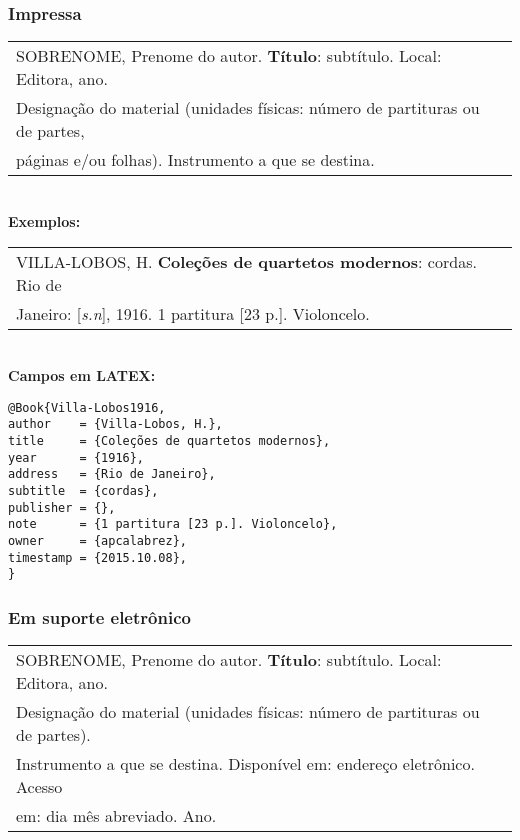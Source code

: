 \subsubsection{Impressa}


\begin{tabular}{|l|c|} \hline
	SOBRENOME, Prenome do autor. \textbf{Título}: subtítulo. Local: Editora, ano.\\
	Designação do material (unidades físicas: número de partituras ou de partes,\\
	p\'aginas e/ou folhas). Instrumento a que se destina. 
	\\\hline
\end{tabular} \\

\textbf{Exemplos:} \\

\begin{tabular}{|l|c|} \hline
	VILLA-LOBOS, H. \textbf{Coleções de quartetos modernos}: cordas. Rio de \\Janeiro: [\textit{s.n}], 1916. 1 partitura [23 p.]. Violoncelo. 
	\\\hline
\end{tabular} \\

\textbf{Campos em LATEX:} 

\begin{verbatim}
@Book{Villa-Lobos1916,
author    = {Villa-Lobos, H.},
title     = {Coleções de quartetos modernos},
year      = {1916},
address   = {Rio de Janeiro},
subtitle  = {cordas},
publisher = {},
note      = {1 partitura [23 p.]. Violoncelo},
owner     = {apcalabrez},
timestamp = {2015.10.08},
}
\end{verbatim}

\subsubsection{Em suporte eletrônico}

\begin{tabular}{|l|c|} \hline
	SOBRENOME, Prenome do autor. \textbf{Título}: subtítulo. Local: Editora,
	ano. \\Designação do material (unidades físicas: número de
	partituras ou de partes).\\Instrumento a que se destina. Disponível
	em: endereço eletrônico. Acesso \\em: dia m\^es abreviado. Ano. 
	\\\hline
\end{tabular} \\


